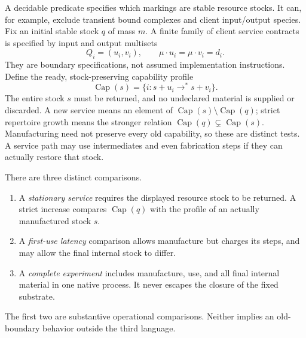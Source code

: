 \documentclass[11pt]{article}
\theoremstyle{definition}
\theoremstyle{remark}
\begin{document}
A decidable predicate specifies which markings are stable resource stocks. It can, for example, exclude transient bound complexes and client input/output species. Fix an initial stable stock $q$ of mass $m$. A finite family of client service contracts is specified by input and output multisets
\[
 Q_i=(u_i,v_i),\qquad\mu\mathbin\cdot u_i=\mu\mathbin\cdot v_i=d_i.
\]
They are boundary specifications, not assumed implementation instructions. Define the ready, stock-preserving capability profile
\begin{equation}\label{er:eq:profile}
 \operatorname{Cap}(s)=\{i:s+u_i\longrightarrow^*s+v_i\}.
\end{equation}
The entire stock $s$ must be returned, and no undeclared material is supplied or discarded. A new service means an element of $\operatorname{Cap}(s)\setminus\operatorname{Cap}(q)$; strict repertoire growth means the stronger relation $\operatorname{Cap}(q)\subsetneq\operatorname{Cap}(s)$. Manufacturing need not preserve every old capability, so these are distinct tests. A service path may use intermediates and even fabrication steps if they can actually restore that stock.

There are three distinct comparisons.
\begin{enumerate}
\item A \emph{stationary service} requires the displayed resource stock to be returned. A strict increase compares $\operatorname{Cap}(q)$ with the profile of an actually manufactured stock $s$.
\item A \emph{first-use latency} comparison allows manufacture but charges its steps, and may allow the final internal stock to differ.
\item A \emph{complete experiment} includes manufacture, use, and all final internal material in one native process. It never escapes the closure of the fixed substrate.
\end{enumerate}
The first two are substantive operational comparisons. Neither implies an old-boundary behavior outside the third language.
\end{document}
